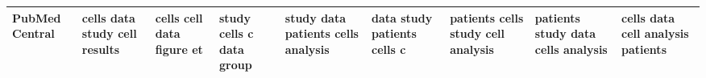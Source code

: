 \documentclass[11pt,a4paper]{article}
\begin{document}
\begin{appendices}
\begin{table}[htp]
\begin{tiny}
\begin{tabular}{|p{}|p{}|p{}|p{}|p{}|p{}|p{}|p{}|p{}|}
PubMed Central & cells \newline data \newline study \newline cell \newline results & cells \newline cell \newline data \newline figure \newline et & study \newline cells \newline c \newline data \newline group & study \newline data \newline patients \newline cells \newline analysis & data \newline study \newline patients \newline cells \newline c & patients \newline cells \newline study \newline cell \newline analysis & patients \newline study \newline data \newline cells \newline analysis & cells \newline data \newline cell \newline analysis \newline patients\\\hline

\end{tabular}
\end{tiny}
\end{table}
\end{appendices}
\end{document}
